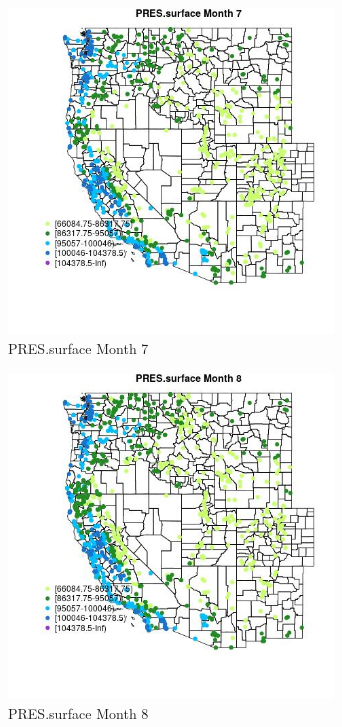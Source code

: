 \begin{figure} 
\centering  
\includegraphics[width=0.77\textwidth]{Code_Outputs/Report_ML_input_PM25_Step4_part_f_de_duplicated_aves_prioritize_24hr_obswNAs_MapObsMo7PRESsurface.jpg} 
\caption{\label{fig:Report_ML_input_PM25_Step4_part_f_de_duplicated_aves_prioritize_24hr_obswNAsMapObsMo7PRESsurface}PRES.surface Month 7} 
\end{figure} 
 

\begin{figure} 
\centering  
\includegraphics[width=0.77\textwidth]{Code_Outputs/Report_ML_input_PM25_Step4_part_f_de_duplicated_aves_prioritize_24hr_obswNAs_MapObsMo8PRESsurface.jpg} 
\caption{\label{fig:Report_ML_input_PM25_Step4_part_f_de_duplicated_aves_prioritize_24hr_obswNAsMapObsMo8PRESsurface}PRES.surface Month 8} 
\end{figure} 
 

